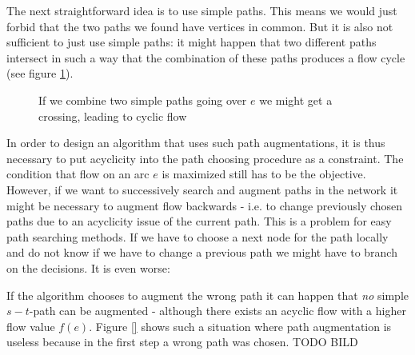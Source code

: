 The next straightforward idea is to use simple paths. This means we would just forbid that the two paths we found have 
vertices in common. 
But it is also not sufficient to just use simple paths: it might happen that two different paths intersect in 
such a way that the combination of these paths produces a flow cycle (see figure 
\ref{bild:cycleFromDifferentCombinedPaths}).


\begin{figure}[h!]
\centering
{}
\caption{If we combine two simple paths going over $e$ we might get a crossing, leading to cyclic flow}
 \label{bild:cycleFromDifferentCombinedPaths}
\end{figure}

In order to design an algorithm that uses such path augmentations, it is thus necessary to put acyclicity into the path 
choosing procedure as a constraint. The condition that flow on an arc $e$ is maximized still has to be the objective.
However, if we want to successively search and augment paths in the network it might be necessary to augment flow 
backwards - i.e. to change previously chosen paths due to an acyclicity issue of the current path.
This is a problem for easy path searching methods. If we have to choose a next node for the path locally and do not 
know if we have to change a previous path we might have to branch on the decisions. It is even worse: 

If the algorithm chooses to augment the wrong path it can happen that \textit{no} simple $s-t$-path can be augmented -
although there exists an acyclic flow with a higher flow value $f(e)$. Figure \ref{} shows such a situation where path 
augmentation is useless because in the first step a wrong path was chosen. TODO BILD

